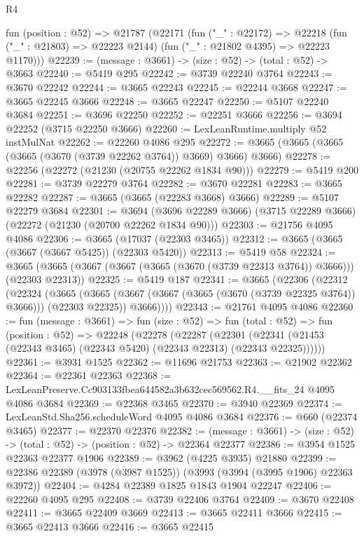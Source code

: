 \begin{lexlean}{R4}
\begin{coremodule}
  fun (position : @52) =>
  @21787
    (@22171
      (fun ("_" : @22172) =>
      @22218 (fun ("_" : @21803) => @22223 @2144) (fun ("_" : @21802 @4395) => @22223 @1170)))
@22239 := (message : @3661) -> (size : @52) -> (total : @52) -> @3663
@22240 := @5419 @295
@22242 := @3739 @22240 @3764
@22243 := @3670 @22242
@22244 := @3665 @22243
@22245 := @22244 @3668
@22247 := @3665 @22245 @3666
@22248 := @3665 @22247
@22250 := @5107 @22240 @3684
@22251 := @3696 @22250
@22252 := @22251 @3666
@22256 := @3694 @22252 (@3715 @22250 @3666)
@22260 := LexLeanRuntime.multiply @52 instMulNat
@22262 := @22260 @4086 @295
@22272 := @3665 (@3665 (@3665 (@3665 (@3670 (@3739 @22262 @3764)) @3669) @3666) @3666)
@22278 := @22256 (@22272 (@21230 (@20755 @22262 @1834 @90)))
@22279 := @5419 @200
@22281 := @3739 @22279 @3764
@22282 := @3670 @22281
@22283 := @3665 @22282
@22287 := @3665 (@3665 (@22283 @3668) @3666)
@22289 := @5107 @22279 @3684
@22301 := @3694
    (@3696 @22289 @3666)
    (@3715 @22289 @3666)
    (@22272 (@21230 (@20700 @22262 @1834 @90)))
@22303 := @21756 @4095 @4086
@22306 := @3665 (@17037 (@22303 @3465))
@22312 := @3665 (@3665 (@3667 (@3667 @5425)) (@22303 @5420))
@22313 := @5419 @58
@22324 := @3665 (@3665 (@3667 (@3667 (@3665 (@3670 (@3739 @22313 @3764)) @3666))) (@22303 @22313))
@22325 := @5419 @187
@22341 := @3665
    (@22306
      (@22312
        (@22324
          (@3665
            (@3665 (@3667 (@3667 (@3665 (@3670 (@3739 @22325 @3764)) @3666))) (@22303 @22325))
            @3666))))
@22343 := @21761 @4095 @4086
@22360 := fun (message : @3661) =>
  fun (size : @52) =>
  fun (total : @52) =>
  fun (position : @52) =>
  @22248
    (@22278
      (@22287
        (@22301 (@22341 (@21453 (@22343 @3465) (@22343 @5420) (@22343 @22313) (@22343 @22325))))))
@22361 := @3931 @1525
@22362 := @11696 @21753
@22363 := @21902 @22362
@22364 := @22361 @22363
@22368 := LexLeanPreserve.Cc903133fbea644582a3b632cec569562.R4.__fits_24 @4095 @4086 @3684
@22369 := @22368 @3465
@22370 := @3940 @22369
@22374 := LexLeanStd.Sha256.scheduleWord @4095 @4086 @3684
@22376 := @660 (@22374 @3465)
@22377 := @22370 @22376
@22382 := (message : @3661) -> (size : @52) -> (total : @52) -> (position : @52) -> @22364 @22377
@22386 := @3954 @1525 @22363 @22377 @1906
@22389 := @3962 (@4225 @3935) @21880
@22399 := @22386 @22389 (@3978 (@3987 @1525)) (@3993 (@3994 (@3995 @1906) @22363 @3972))
@22404 := @4284 @22389 @1825 @1843 @1904 @22247
@22406 := @22260 @4095 @295
@22408 := @3739 @22406 @3764
@22409 := @3670 @22408
@22411 := @3665 @22409 @3669
@22413 := @3665 @22411 @3666
@22415 := @3665 @22413 @3666
@22416 := @3665 @22415

\end{coremodule}
\end{lexlean}
